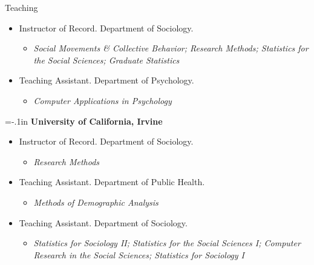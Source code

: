 \documentclass{resume} %
\newenvironment{hangt}[1]
 {\par\vspace{-\parsep}%
  \begin{itemize}[label={#1\ \quad},leftmargin=*,labelsep=0pt]
  \raggedright
  \item\relax
  \vspace*{8pt}
  }
 {\end{itemize}}
\newcommand{\datefill}{\quad \hspace{12pt}}
\begin{document}
\begin{rSection}{Teaching}
\begin{hangt}{2016--2019}
Instructor of Record. Department of Sociology. 
\vspace*{-.5em} 
\begin{itemize}[leftmargin=.25in] \vspace*{-.25em} 
\item {\footnotesize \it Social Movements \& Collective Behavior\textup{;} Research Methods\textup{;} Statistics for the Social Sciences\textup{;} Graduate Statistics}
\end{itemize}
\end{hangt}
\vspace*{-.5em} 
\begin{hangt}{2009--2010}
Teaching Assistant. Department of Psychology.
\vspace*{-.5em} 
\begin{itemize}[leftmargin=.25in] \vspace*{-.25em} 
\item {\footnotesize \it Computer Applications in Psychology}
\end{itemize}
\end{hangt}

{\parindent=-.1in {\bf University of California, Irvine}}

\vspace*{-.5em} 
\begin{hangt}{2016 \datefill}
Instructor of Record. Department of Sociology.
\vspace*{-.5em} 
\begin{itemize}[leftmargin=.25in] \vspace*{-.25em} 
\item {\footnotesize \it Research Methods}
\end{itemize}
\end{hangt}
\vspace*{-.5em} 
\begin{hangt}{2015--2017}
Teaching Assistant. Department of Public Health.
\vspace*{-.5em} 
\begin{itemize}[leftmargin=.25in] \vspace*{-.25em} 
\item {\footnotesize \it Methods of Demographic Analysis}
\end{itemize}
\end{hangt}
\vspace*{-.5em} 
\begin{hangt}{2012--2019}
Teaching Assistant. Department of Sociology.
\vspace*{-.5em} 
\begin{itemize}[leftmargin=.25in] \vspace*{-.25em} 
\item {\footnotesize \it Statistics for Sociology II\textup{;} Statistics for the Social Sciences I\textup{;} Computer Research in the Social Sciences\textup{;} Statistics for Sociology I}
\end{itemize}
\end{hangt}


\end{rSection}
\end{document}
